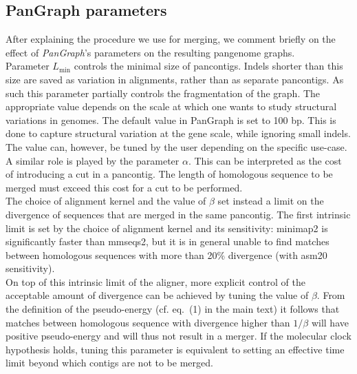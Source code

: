 \documentclass[aps,rmp,reprint,superscriptaddress,notitlepage,10pt,onecolumn]{revtex4-1}
\newcommand{\Lthr}{L_{\min}}
\begin{document}


\subsection{PanGraph parameters}

After explaining the procedure we use for merging, we comment briefly on the effect of \textit{PanGraph}'s parameters on the resulting pangenome graphs.\\

Parameter $\Lthr$ controls the minimal size of pancontigs. Indels shorter than this size are saved as variation in alignments, rather than as separate pancontigs. As such this parameter partially controls the fragmentation of the graph. The appropriate value depends on the scale at which one wants to study structural variations in genomes. The default value in PanGraph is set to 100 bp. This is done to capture structural variation at the gene scale, while ignoring small indels. The value can, however, be tuned by the user depending on the specific use-case.\\
A similar role is played by the parameter $\alpha$. This can be interpreted as the cost of introducing a cut in a pancontig. The length of homologous sequence to be merged must exceed this cost for a cut to be performed.\\

The choice of alignment kernel and the value of $\beta$ set instead a limit on the divergence of sequences that are merged in the same pancontig. The first intrinsic limit is set by the choice of alignment kernel and its sensitivity: minimap2 is significantly faster than mmseqs2, but it is in general unable to find matches between homologous sequences with more than 20\% divergence (with asm20 sensitivity).\\
On top of this intrinsic limit of the aligner, more explicit control of the acceptable amount of divergence can be achieved by tuning the value of $\beta$. From the definition of the pseudo-energy (cf. eq.~(1) in the main text) it follows that matches between homologous sequence with divergence higher than $1/\beta$ will have positive pseudo-energy and will thus not result in a merger. If the molecular clock hypothesis holds, tuning this parameter is equivalent to setting an effective time limit beyond which contigs are not to be merged. 
\end{document}
